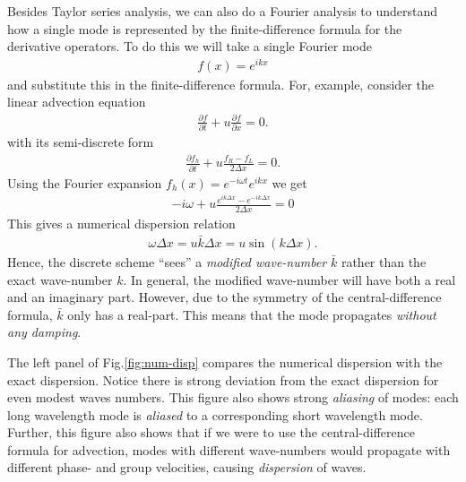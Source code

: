 \documentclass[12pt]{article}
\theoremstyle{definition}
\theoremstyle{definition}
\theoremstyle{definition}
\newcommand{\pfrac}[2]{\frac{\partial #1}{\partial #2}}
\begin{document}
Besides Taylor series analysis, we can also do a Fourier analysis to
understand how a single mode is represented by the finite-difference
formula for the derivative operators. To do this we will take a single
Fourier mode
\begin{align}
  f(x) = e^{ikx}
\end{align}
and substitute this in the finite-difference formula. For, example,
consider the linear advection equation
\begin{align}
  \pfrac{f}{t} + u \pfrac{f}{x} = 0.
\end{align}
with its semi-discrete form
\begin{align}
  \pfrac{f_h}{t} + u \frac{f_R - f_L}{2 \Delta x} = 0.
\end{align}
Using the Fourier expansion $f_h(x) = e^{-i\omega t} e^{ikx}$ we get
\begin{align}
  -i\omega + u \frac{e^{ik \Delta x } - e^{-ik \Delta x } }{2 \Delta x} = 0
\end{align}
This gives a numerical dispersion relation
\begin{align}
  \omega \Delta x  =  u \bar{k} \Delta x = u \sin(k\Delta x).
\end{align}
Hence, the discrete scheme ``sees'' a \emph{modified wave-number}
$\bar{k}$ rather than the exact wave-number $k$. In general, the
modified wave-number will have both a real and an imaginary
part. However, due to the symmetry of the central-difference formula,
$\bar{k}$ only has a real-part. This means that the mode propagates
\emph{without any damping}. 

The left panel of Fig.\thinspace\ref{fig:num-disp} compares the
numerical dispersion with the exact dispersion.  Notice there is
strong deviation from the exact dispersion for even modest waves
numbers. This figure also shows strong \emph{aliasing} of modes: each
long wavelength mode is \emph{aliased} to a corresponding short
wavelength mode. Further, this figure also shows that if we were to
use the central-difference formula for advection, modes with different
wave-numbers would propagate with different phase- and group
velocities, causing \emph{dispersion} of waves.
\end{document}
